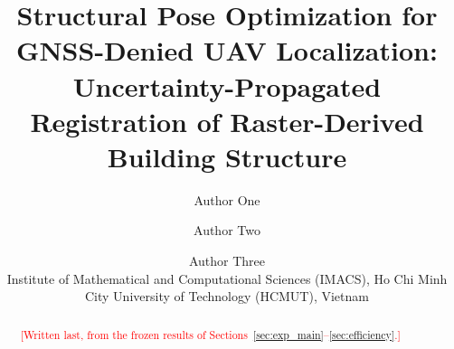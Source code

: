 \documentclass[10pt]{article}
\title{\textbf{Structural Pose Optimization for GNSS-Denied UAV Localization:\\
Uncertainty-Propagated Registration of Raster-Derived Building Structure}}
\author{Author One \and Author Two \and Author Three\\[2pt]
\small Institute of Mathematical and Computational Sciences (IMACS),
Ho Chi Minh City University of Technology (HCMUT), Vietnam}
\date{}
\theoremstyle{plain}
\newcommand{\TBD}[1]{\textcolor{red}{[#1]}}
\begin{document}
\maketitle

\begin{abstract}
\TBD{Written last, from the frozen results of Sections~\ref{sec:exp_main}--\ref{sec:efficiency}.}
\end{abstract}











\end{document}

